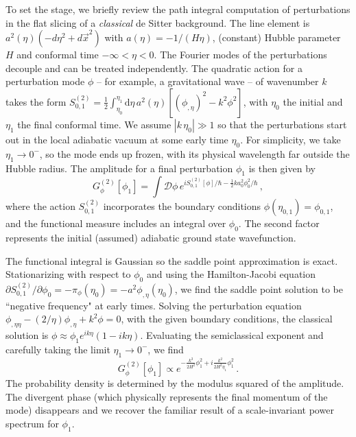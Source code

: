 \documentclass[twocolumn,amsmath,amssymb,superscriptaddress,nofootinbib]{revtex4-1}
\begin{document}
To set the stage, we briefly review the path integral computation of perturbations in the flat slicing of a {\it classical} de Sitter background. The line element is $ a^2(\eta)(- d\eta^2 +d\vec{x}^2)$ with $a(\eta) = -1/(H \eta)$, (constant) Hubble parameter $H$ and conformal time $-\infty<\eta<0$. 
The Fourier modes of the perturbations decouple and can be treated independently. 
The quadratic action for a perturbation mode $\phi$ -- for example, a gravitational wave -- of wavenumber $k$ takes the form 
$S^{(2)}_{0,1}
=\frac{1}{2} \int_{\eta_0}^{\eta_1} \mathrm{d}\eta\, a^2(\eta) \left[ \left(\phi_{,\eta}\right)^2 -  k^2 \phi^2\right]$, with $\eta_0$ the initial and $\eta_1$ the final conformal time.
 We assume $|k\, \eta_0| \gg 1$ so that the perturbations start out in the local adiabatic vacuum at some early time $\eta_0$. 
 For simplicity, we take $\eta_1\rightarrow 0^-$, so the mode ends up frozen, with its physical wavelength far outside the Hubble radius. The amplitude for a final perturbation $\phi_1$ is then given by
\begin{equation}
G^{(2)}_\phi[\phi_1] = \int \mathcal{D}\phi\, e^{iS^{(2)}_{0,1}[\phi]/\hbar-\frac{1}{2}k a_0^2 \phi_{0}^2/\hbar}\,,\nonumber
\end{equation}
where the action $S^{(2)}_{0,1}$ incorporates the boundary conditions $\phi(\eta_{0,1}) =\phi_{0,1}$, and the functional measure includes an integral over $\phi_0$. The second factor represents the initial (assumed) adiabatic ground state wavefunction. 



The functional integral is Gaussian so the saddle point approximation is exact. Stationarizing with respect to $\phi_0$ and using the Hamilton-Jacobi equation $\partial S^{(2)}_{0,1}/\partial \phi_0=-\pi_\phi(\eta_0)=-a^2 \phi_{,\eta}(\eta_0)$, we find the saddle point solution to be ``negative frequency" at early times. Solving the perturbation equation $\phi_{,\eta\eta} - (2/\eta) \phi_{,\eta} + k^2 \phi = 0$, with the given boundary conditions, the classical solution is  $\phi \approx \phi_1 e^{ik\eta}\left(1- ik\eta \right)$. Evaluating the semiclassical exponent and carefully taking the limit $\eta_1\rightarrow 0^-$, we find 
\begin{equation}
G^{(2)}_\phi[\phi_1] \propto e^{-\frac{k^3}{2H^2}\phi_1^2 + i \frac{k^2}{2H^2\eta_1}\phi_1^2}\,.\label{eqforg}
\end{equation}
The probability density is determined by the modulus squared of the amplitude. The divergent phase (which physically represents the final momentum of the mode) disappears and we recover the familiar result of a scale-invariant power spectrum for $\phi_1$.
\end{document}
